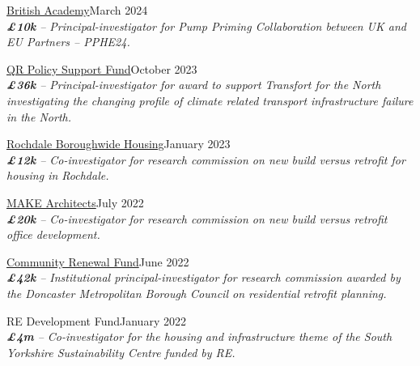 \documentclass[10pt]{article}
\newcommand{\blankline}{\quad\pagebreak[3]}
\begin{document}
\href{https://www.thebritishacademy.ac.uk/news/the-british-academy-awards-horizon-europe-pump-priming-collaboration-funding-to-develop-horizon-europe-collaborations/}{British Academy}\hfill {March 2024}\\
\emph{\textbf{\pounds10k} -- Principal-investigator for Pump Priming Collaboration between UK and EU Partners -- PPHE24.}
\FPset{}
\FPset{}

\blankline

\href{}{QR Policy Support Fund}\hfill {October 2023}\\
\emph{\textbf{\pounds36k} -- Principal-investigator for award to support Transfort for the North investigating the changing profile of climate related transport infrastructure failure in the North.}
\FPset{}
\FPset{}

\blankline

\href{}{Rochdale Boroughwide Housing}\hfill {January 2023}\\
\emph{\textbf{\pounds12k} -- Co-investigator for research commission on new build versus retrofit for housing in Rochdale.}%
\FPset{}
\FPset{}

\blankline

\href{}{MAKE Architects}\hfill {July 2022}\\
\emph{\textbf{\pounds20k} -- Co-investigator for research commission on new build versus retrofit office development.}%
\FPset{}
\FPset{}

\blankline

\href{}{Community Renewal Fund}\hfill {June 2022}\\
\emph{\textbf{\pounds42k} -- Institutional principal-investigator for research commission awarded by the Doncaster Metropolitan Borough Council on residential retrofit planning.}
\FPset{}
\FPset{}
%
%

\blankline

RE Development Fund\hfill {January 2022}\\
\emph{\textbf{\pounds4m} -- Co-investigator for the housing and infrastructure theme of the South Yorkshire Sustainability Centre funded by RE.}
\FPset{}
\FPset{}
\end{document}
